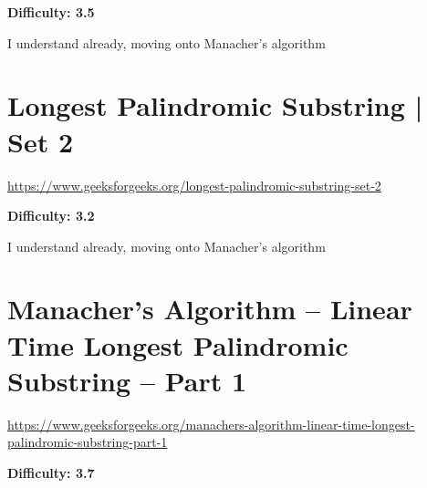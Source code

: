 \textbf{Difficulty: 3.5}

\textbf{}

\RayNotesBegin

I understand already, moving onto Manacher's algorithm

\RayNotesEnd

\textbf{}






\section{Longest Palindromic Substring | Set 2
  \label{secLPSStrGFGLngstPlndrmcSbstrngSet2}}

\url{https://www.geeksforgeeks.org/longest-palindromic-substring-set-2}

\textbf{Difficulty: 3.2}

\textbf{}

\RayNotesBegin

I understand already, moving onto Manacher's algorithm

\RayNotesEnd

\textbf{}





\section{Manacher's Algorithm -- Linear Time Longest Palindromic Substring -- Part 1
  \label{secLPSStrGFGManacherPt1}}

\url{https://www.geeksforgeeks.org/manachers-algorithm-linear-time-longest-palindromic-substring-part-1}

\textbf{Difficulty: 3.7}

